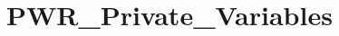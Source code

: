 \hypertarget{group___p_w_r___private___variables}{}\section{P\+W\+R\+\_\+\+Private\+\_\+\+Variables}
\label{group___p_w_r___private___variables}
